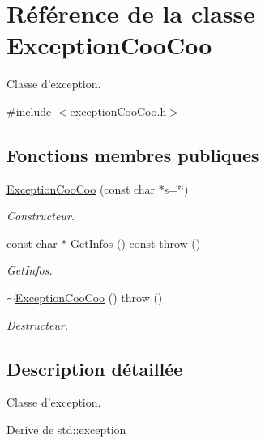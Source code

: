 \hypertarget{class_exception_coo_coo}{\section{Référence de la classe Exception\-Coo\-Coo}
\label{class_exception_coo_coo}
}


Classe d'exception.  




{\ttfamily \#include $<$exception\-Coo\-Coo.\-h$>$}

\subsection*{Fonctions membres publiques}
\begin{DoxyCompactItemize}
\item 
\hyperlink{class_exception_coo_coo_abc4fda1d887ebf8167aa292b22006cbf}{Exception\-Coo\-Coo} (const char $\ast$s=\char`\"{}\char`\"{})
\begin{DoxyCompactList}\small\item\em Constructeur. \end{DoxyCompactList}\item 
const char $\ast$ \hyperlink{class_exception_coo_coo_a146a13e09e5071f4d9461b11701ba5aa}{Get\-Infos} () const   throw ()
\begin{DoxyCompactList}\small\item\em Get\-Infos. \end{DoxyCompactList}\item 
\hypertarget{class_exception_coo_coo_a4da74063dcd709e6bf23b4d77275a362}{\hyperlink{class_exception_coo_coo_a4da74063dcd709e6bf23b4d77275a362}{$\sim$\-Exception\-Coo\-Coo} ()  throw ()}\label{class_exception_coo_coo_a4da74063dcd709e6bf23b4d77275a362}

\begin{DoxyCompactList}\small\item\em Destructeur. \end{DoxyCompactList}\end{DoxyCompactItemize}


\subsection{Description détaillée}
Classe d'exception. 

Derive de std\-::exception 

